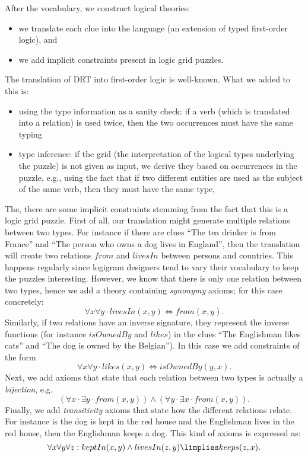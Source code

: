 After the vocabulary, we construct logical theories: 
\begin{itemize}
 \item we translate each clue into the \idp language (an extension of typed first-order logic), and
 \item we add implicit constraints present in logic grid puzzles.
\end{itemize}
The translation of DRT into first-order logic is well-known. What we added to this is:  
\begin{itemize}
 \item using the type information as a sanity check: if a verb (which is translated into a relation) is used twice, then the two occurrences must have the same typing
 \item type inference: if the grid (the interpretation of the logical types underlying the puzzle) is not given as input, we derive they based on occurrences in the puzzle, e.g., using the fact that if two different entities are used as the subject of the same verb, then they must have the same type,
\end{itemize}

The, there are some implicit constraints stemming from the fact that this is a logic grid puzzle. 
First of all, our translation might generate multiple relations between two types. For instance if there are clues ``The tea drinker is from France'' and ``The person who owns a dog lives in England'', then the translation will create two relations $\mathit{from}$ and $\mathit{livesIn}$ between persons and countries. This happens regularly since logigram designers tend to vary their vocabulary to keep the puzzles interesting. However, we know that there is only one relation between two types, hence we add a theory containing \emph{synonymy} axioms; for this case concretely: 
\[\forall x \forall y \cdot livesIn(x, y) \Leftrightarrow from(x, y).\]
Similarly, if two relations have an inverse signature, they represent the inverse functions (for instance $\mathit{isOwnedBy}$ and $\mathit{likes}$) in the clues ``The Englishman likes cats'' and ``The dog is owned by the Belgian''). In this case we add constraints of the form
\[\forall x \forall y \cdot likes(x, y) \Leftrightarrow isOwnedBy(y,x).\]
Next, we add axioms that state that each relation between two types is actually a \emph{bijection}, e.g. 
\[(\forall x \cdot \exists y \cdot from(x, y)) \land (\forall y \cdot \exists x \cdot from(x, y)).\]
Finally, we add \emph{transitivity} axioms that state how the different relations relate. For instance is the dog is kept in the red house and the Englishman lives in the red house, then the Englishman keeps a dog. This kind of axioms is expressed as:
\[
 \forall x \forall y \forall z: keptIn(x,y) \land livesIn(z,y) \limplies keeps(z,x).
\]


